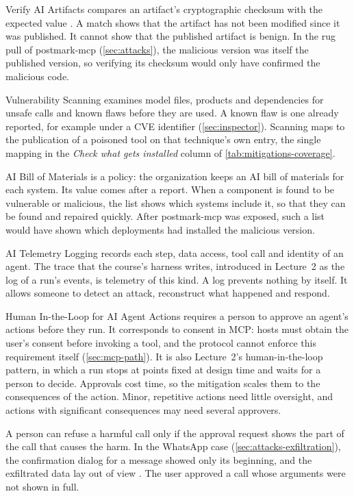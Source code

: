 Verify AI Artifacts compares an artifact's cryptographic checksum with the expected value
\citep{mitre-atlas-2026}. A match shows that the artifact has not been modified since it was
published. It cannot show that the published artifact is benign. In the rug pull of postmark-mcp
(\cref{sec:attacks}), the malicious version was itself the published version, so verifying its
checksum would only have confirmed the malicious code.

Vulnerability Scanning examines model files, products and dependencies for unsafe calls and known
flaws before they are used. A known flaw is one already reported, for example under a CVE
identifier (\cref{sec:inspector}). Scanning maps to the publication of a poisoned tool on that
technique's own entry, the single mapping in the \emph{Check what gets installed} column of
\cref{tab:mitigations-coverage}.

AI Bill of Materials is a policy: the organization keeps an AI bill of materials for each system.
Its value comes after a report. When a component is found to be vulnerable or malicious, the list
shows which systems include it, so that they can be found and repaired quickly. After postmark-mcp
was exposed, such a list would have shown which deployments had installed the malicious version.

AI Telemetry Logging records each step, data access, tool call and identity of an agent. The trace
that the course's harness writes, introduced in Lecture~2 as the log of a run's events, is
telemetry of this kind. A log prevents nothing by itself. It allows someone to detect an attack,
reconstruct what happened and respond.

Human In-the-Loop for AI Agent Actions requires a person to approve an agent's actions before they
run. It corresponds to consent in MCP: hosts must obtain the user's consent before invoking a tool,
and the protocol cannot enforce this requirement itself (\cref{sec:mcp-path}). It is also Lecture~2's
human-in-the-loop pattern, in which a run stops at points fixed at design time and waits for a
person to decide. Approvals cost time, so the mitigation scales them to the consequences of the
action. Minor, repetitive actions need little oversight, and actions with significant consequences
may need several approvers.

A person can refuse a harmful call only if the approval request shows the part of the call that
causes the harm. In the WhatsApp case (\cref{sec:attacks-exfiltration}), the confirmation dialog for a message
showed only its beginning, and the exfiltrated data lay out of view
\citep{beurerkellner2025whatsapp}. The user approved a call whose arguments were not shown in full.

